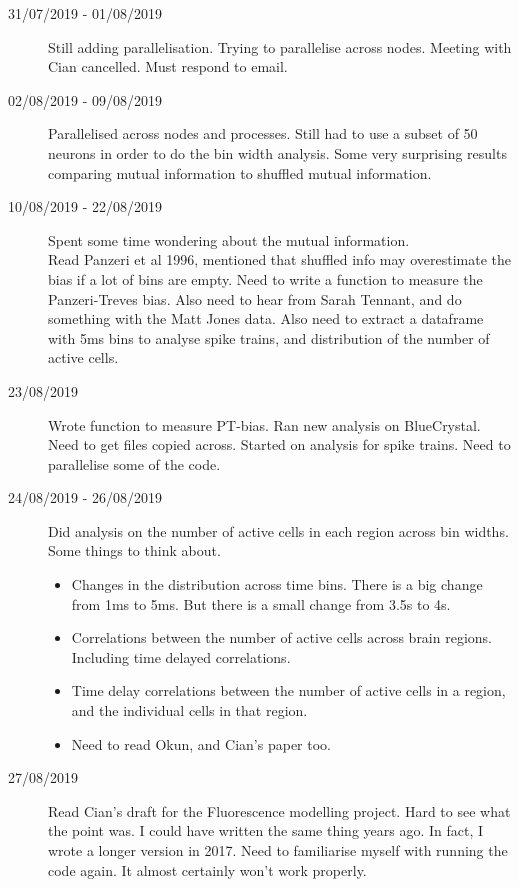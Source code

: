 \documentclass[a4paper,12pt]{article}
\theoremstyle{definition}
\begin{document}
\begin{description}
	\item[31/07/2019 - 01/08/2019] Still adding parallelisation. Trying to parallelise across nodes. Meeting with Cian cancelled. Must respond to email.

	\item[02/08/2019 - 09/08/2019] Parallelised across nodes and processes. Still had to use a subset of 50 neurons in order to do the bin width analysis. Some very surprising results comparing mutual information to shuffled mutual information.

	\item[10/08/2019 - 22/08/2019] Spent some time wondering about the mutual information. \\ Read Panzeri et al 1996, mentioned that shuffled info may overestimate the bias if a lot of bins are empty. Need to write a function to measure the Panzeri-Treves bias. Also need to hear from Sarah Tennant, and do something with the Matt Jones data. Also need to extract a dataframe with 5ms bins to analyse spike trains, and distribution of the number of active cells.

	\item[23/08/2019] Wrote function to measure PT-bias. Ran new analysis on BlueCrystal. Need to get files copied across. Started on analysis for spike trains. Need to parallelise some of the code.

	\item[24/08/2019 - 26/08/2019] Did analysis on the number of active cells in each region across bin widths. Some things to think about.
	\begin{itemize}
		\item Changes in the distribution across time bins. There is a big change from 1ms to 5ms. But there is a small change from 3.5s to 4s.
		\item Correlations between the number of active cells across brain regions. Including time delayed correlations.
		\item Time delay correlations between the number of active cells in a region, and the individual cells in that region.
		\item Need to read Okun, and Cian's paper too.
	\end{itemize}

	\item[27/08/2019] Read Cian's draft for the Fluorescence modelling project. Hard to see what the point was. I could have written the same thing years ago. In fact, I wrote a longer version in 2017. Need to familiarise myself with running the code again. It almost certainly won't work properly.


\end{description}
\end{document}
